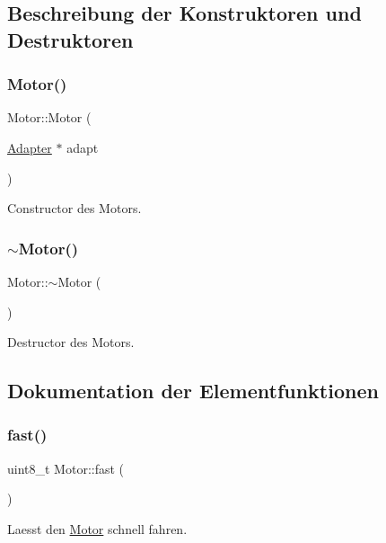 \subsection{Beschreibung der Konstruktoren und Destruktoren}
\hypertarget{class_motor_a9150fc4647f7588364cb75dca1df4c96}{}\label{class_motor_a9150fc4647f7588364cb75dca1df4c96} 
\subsubsection{\texorpdfstring{Motor()}{Motor()}}
{\footnotesize\ttfamily Motor\+::\+Motor (\begin{DoxyParamCaption}\item[{\hyperlink{class_adapter}{Adapter} $\ast$}]{adapt }\end{DoxyParamCaption})}

Constructor des Motors. \hypertarget{class_motor_a2e57c7b2681efea1d3b7f253ee88ecd4}{}\label{class_motor_a2e57c7b2681efea1d3b7f253ee88ecd4} 
\subsubsection{\texorpdfstring{$\sim$\+Motor()}{~Motor()}}
{\footnotesize\ttfamily Motor\+::$\sim$\+Motor (\begin{DoxyParamCaption}{ }\end{DoxyParamCaption})\hspace{0.3cm}{\ttfamily [virtual]}}

Destructor des Motors. 

\subsection{Dokumentation der Elementfunktionen}
\hypertarget{class_motor_a09b1a5376d1ea0eb39dff2ebcc325bde}{}\label{class_motor_a09b1a5376d1ea0eb39dff2ebcc325bde} 
\subsubsection{\texorpdfstring{fast()}{fast()}}
{\footnotesize\ttfamily uint8\+\_\+t Motor\+::fast (\begin{DoxyParamCaption}{ }\end{DoxyParamCaption})}

Laesst den \hyperlink{class_motor}{Motor} schnell fahren.

